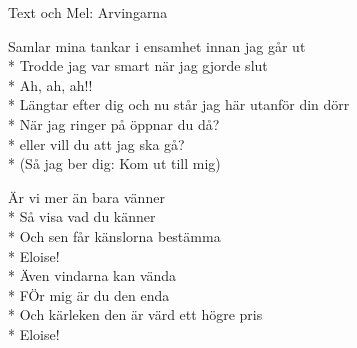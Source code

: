 \begin{SongText}[Eloise]
    \begin{SongInfo}
        Text och Mel: Arvingarna
    \end{SongInfo}
    \begin{SongVerse}
        Samlar mina tankar i ensamhet innan jag går ut\\*%
        Trodde jag var smart när jag gjorde slut\\*%
        Ah, ah, ah!!\\*%
        Längtar efter dig och nu står jag här utanför din dörr\\*%
        När jag ringer på öppnar du då?\\*%
        eller vill du att jag ska gå?\\*%
        (Så jag ber dig: Kom ut till mig)
    \end{SongVerse}
    \begin{SongVerse}
        Är vi mer än bara vänner\\*%
        Så visa vad du känner\\*%
        Och sen får känslorna bestämma\\*%
        Eloise!\\*%
        Även vindarna kan vända\\*%
        FÖr mig är du den enda\\*%
        Och kärleken den är värd ett högre pris\\*%
        Eloise!
    \end{SongVerse}
\end{SongText}
\newpage